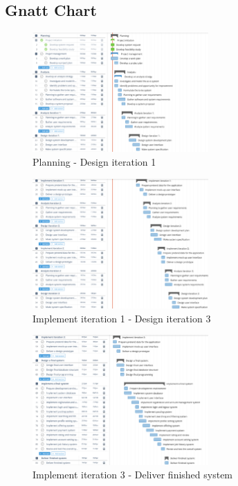 \documentclass[aspectratio=169]{beamer}
\begin{document}
\subsection{Gnatt Chart}

\begin{frame}
    \begin{figure}[!htp]
        \includegraphics[width=0.6\textwidth]{Gnatt1.png}
        \caption{Planning - Design iteration 1}
    \end{figure}
\end{frame}

\begin{frame}
    \begin{figure}[!htp]
        \includegraphics[width=0.6\textwidth]{Gnatt2.png}
        \caption{Implement iteration 1 - Design iteration 3}
    \end{figure}
\end{frame}

\begin{frame}
    \begin{figure}[!htp]
        \includegraphics[width=0.6\textwidth]{Gnatt3.png}
        \caption{Implement iteration 3 - Deliver finished system}
    \end{figure}
\end{frame}
\end{document}

